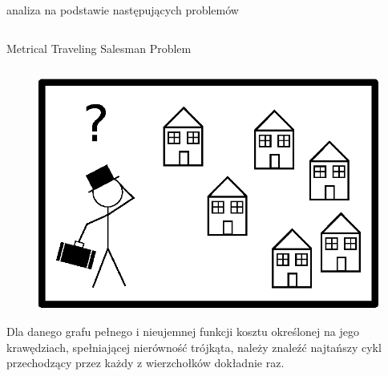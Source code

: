 \documentclass[final,hyperref={pdfpagelabels=false}]{beamer}
\begin{document}
\begin{frame}
  \begin{columns}
    \begin{column}{.96\textwidth}
      \vspace{1cm}
      \begin{center}
        \veryHuge analiza na podstawie następujących problemów
      \end{center}
      \vspace{1cm}
    \end{column}
  \end{columns}

  \begin{columns}
    \begin{column}{.46\textwidth}
      \begin{block}{Metrical Traveling Salesman Problem}
        \begin{minipage}{\linewidth}
          \begin{columns}
            \begin{column}{.38\linewidth}
              \begin{figure}
                \centering
                \includegraphics[width=0.9\linewidth]{stickman_salesman}
              \end{figure}
              Dla danego grafu pełnego i nieujemnej funkcji kosztu określonej na jego krawędziach, spełniającej nierówność trójkąta, należy znaleźć najtańszy
              cykl przechodzący przez każdy z wierzchołków dokładnie raz.
            \end{column}


\end{columns}
\end{minipage}
\end{block}
\end{column}
\end{columns}
\end{frame}
\end{document}
